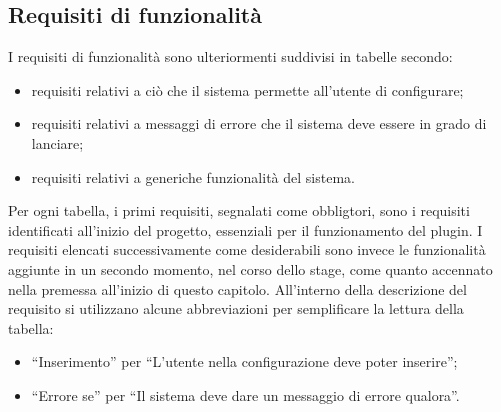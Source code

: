 	\subsection{Requisiti di funzionalità} \label{requisitiFunzionalita}
	I requisiti di funzionalità sono ulteriormenti suddivisi in tabelle secondo:
	\begin{itemize}
		\item requisiti relativi a ciò che il sistema permette all'utente di configurare;
		\item requisiti relativi a messaggi di errore che il sistema deve essere in grado di lanciare;
		\item requisiti relativi a generiche funzionalità del sistema.
	\end{itemize}
	Per ogni tabella, i primi requisiti, segnalati come obbligtori, sono i requisiti identificati all'inizio del progetto, essenziali per il funzionamento del plugin.
	I requisiti elencati successivamente come desiderabili sono invece le funzionalità aggiunte in un secondo momento, nel corso dello stage, come quanto accennato nella premessa all'inizio di questo capitolo.
	All'interno della descrizione del requisito si utilizzano alcune abbreviazioni per semplificare la lettura della tabella:
	\begin{itemize}
		\item ``Inserimento'' per ``L'utente nella configurazione deve poter inserire'';
		\item ``Errore se'' per ``Il sistema deve dare un messaggio di errore qualora''.
	\end{itemize}
		 

